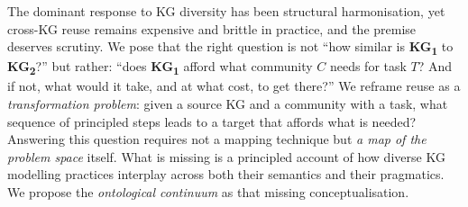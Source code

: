 \documentclass[runningheads]{llncs}
\newenvironment{inboth}{}{}
\begin{document}
\begin{inboth}
%
%
The dominant response to KG diversity has been structural harmonisation, yet cross-KG reuse remains expensive and brittle in practice, and the premise deserves scrutiny.
We pose that the right question is not ``how similar is \textbf{KG\textsubscript{1}} to \textbf{KG\textsubscript{2}}?'' but rather: ``does \textbf{KG\textsubscript{1}} afford what community $C$ needs for task $T$? And if not, what would it take, and at what cost, to get there?'' 
We reframe reuse as a \emph{transformation problem}: given a source KG and a community with a task, what sequence of principled steps leads to a target that affords what is needed? 
Answering this question requires not a mapping technique but \textit{a map of the problem space} itself.
What is missing is a principled account of how diverse KG modelling practices interplay across both their semantics and their pragmatics.
We propose the \emph{ontological continuum} as that missing conceptualisation.


\end{inboth}
\end{document}
